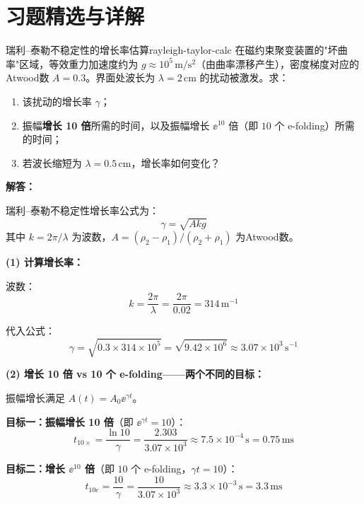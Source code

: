 ﻿%

\section*{习题精选与详解}

\begin{example}{瑞利--泰勒不稳定性的增长率估算}{rayleigh-taylor-calc}
在磁约束聚变装置的"坏曲率"区域，等效重力加速度约为 $g \approx 10^{5}\,\mathrm{m/s^2}$（由曲率漂移产生），密度梯度对应的Atwood数 $A = 0.3$。界面处波长为 $\lambda = 2\,\mathrm{cm}$ 的扰动被激发。求：
\begin{enumerate}[label=(\arabic*)]
\item 该扰动的增长率 $\gamma$；
\item 振幅\textbf{增长 10 倍}所需的时间，以及振幅增长 $\ee^{10}$ 倍（即 $10$ 个 e-folding）所需的时间；
\item 若波长缩短为 $\lambda = 0.5\,\mathrm{cm}$，增长率如何变化？
\end{enumerate}
\tcblower
\textbf{解答：}

瑞利--泰勒不稳定性增长率公式为：
\[
\gamma = \sqrt{A k g}
\]
其中 $k = 2\pi/\lambda$ 为波数，$A = (\rho_2 - \rho_1)/(\rho_2 + \rho_1)$ 为Atwood数。

\textbf{(1) 计算增长率：}

波数：
\[
k = \frac{2\pi}{\lambda} = \frac{2\pi}{0.02} = 314\,\mathrm{m}^{-1}
\]

代入公式：
\[
\gamma = \sqrt{0.3\times 314\times 10^{5}} = \sqrt{9.42\times 10^{6}}
\approx 3.07\times 10^{3}\,\mathrm{s}^{-1}
\]

\textbf{(2) 增长 10 倍 vs 10 个 e-folding——两个不同的目标：}

振幅增长满足 $A(t) = A_0\ee^{\gamma t}$。

\textbf{目标一：振幅增长 10 倍}（即 $\ee^{\gamma t}=10$）：
\[
t_{10\times} = \frac{\ln 10}{\gamma} = \frac{2.303}{3.07\times 10^{3}} \approx 7.5\times 10^{-4}\,\mathrm{s} = 0.75\,\mathrm{ms}
\]

\textbf{目标二：增长 $\ee^{10}$ 倍}（即 $10$ 个 e-folding，$\gamma t=10$）：
\[
t_{10e} = \frac{10}{\gamma} = \frac{10}{3.07\times 10^{3}} \approx 3.3\times 10^{-3}\,\mathrm{s} = 3.3\,\mathrm{ms}
\]


\end{example}
